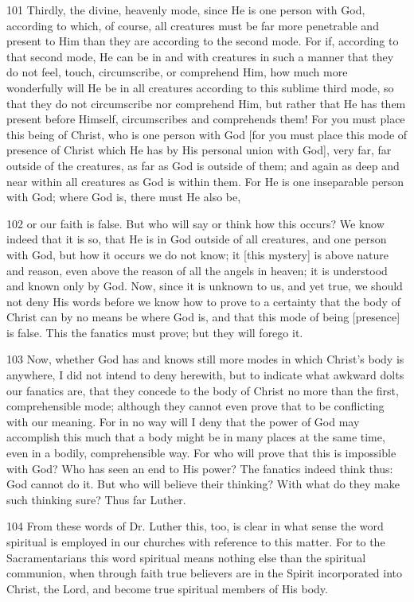 101 Thirdly, the divine, heavenly mode, since He is one person with God, according to which, of course, all creatures must be far more penetrable and present to Him than they are according to the second mode. For if, according to that second mode, He can be in and with creatures in such a manner that they do not feel, touch, circumscribe, or comprehend Him, how much more wonderfully will He be in all creatures according to this sublime third mode, so that they do not circumscribe nor comprehend Him, but rather that He has them present before Himself, circumscribes and comprehends them! For you must place this being of Christ, who is one person with God [for you must place this mode of presence of Christ which He has by His personal union with God], very far, far outside of the creatures, as far as God is outside of them; and again as deep and near within all creatures as God is within them. For He is one inseparable person with God; where God is, there must He also be,

102 or our faith is false. But who will say or think how this occurs? We know indeed that it is so, that He is in God outside of all creatures, and one person with God, but how it occurs we do not know; it [this mystery] is above nature and reason, even above the reason of all the angels in heaven; it is understood and known only by God. Now, since it is unknown to us, and yet true, we should not deny His words before we know how to prove to a certainty that the body of Christ can by no means be where God is, and that this mode of being [presence] is false. This the fanatics must prove; but they will forego it.

103 Now, whether God has and knows still more modes in which Christ’s body is anywhere, I did not intend to deny herewith, but to indicate what awkward dolts our fanatics are, that they concede to the body of Christ no more than the first, comprehensible mode; although they cannot even prove that to be conflicting with our meaning. For in no way will I deny that the power of God may accomplish this much that a body might be in many places at the same time, even in a bodily, comprehensible way. For who will prove that this is impossible with God? Who has seen an end to His power? The fanatics indeed think thus: God cannot do it. But who will believe their thinking? With what do they make such thinking sure? Thus far Luther.

104 From these words of Dr. Luther this, too, is clear in what sense the word spiritual is employed in our churches with reference to this matter. For to the Sacramentarians this word spiritual means nothing else than the spiritual communion, when through faith true believers are in the Spirit incorporated into Christ, the Lord, and become true spiritual members of His body.

